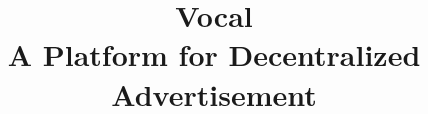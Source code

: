 \documentclass[conference]{IEEEtran}
\begin{document}
    \title{Vocal\\ A Platform for Decentralized Advertisement}
    
    
    \author{
    \and
    }
    
    
    
    
    \maketitle
    
\end{document}
